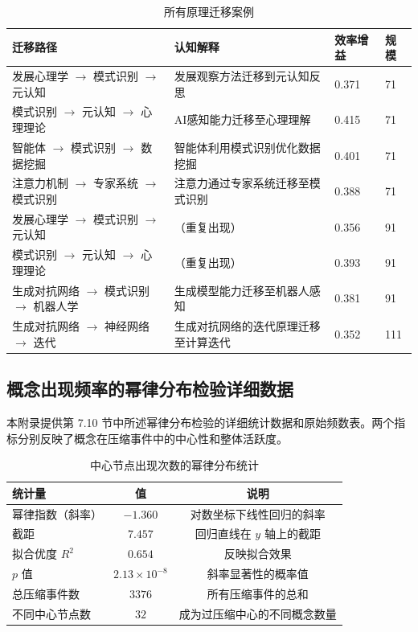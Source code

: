 \documentclass[12pt,a4paper]{article}
\begin{document}
\begin{table}[H]
\centering
\caption{所有原理迁移案例}
\label{tab:app_migration_cases}
\begin{tabular}{p{4cm}p{4.5cm}p{2cm}p{1cm}}
\toprule
\textbf{迁移路径} & \textbf{认知解释} & \textbf{效率增益} & \textbf{规模} \\
\midrule
发展心理学 $\rightarrow$ 模式识别 $\rightarrow$ 元认知 & 发展观察方法迁移到元认知反思 & 0.371 & 71 \\
模式识别 $\rightarrow$ 元认知 $\rightarrow$ 心理理论 & AI感知能力迁移至心理理解 & 0.415 & 71 \\
智能体 $\rightarrow$ 模式识别 $\rightarrow$ 数据挖掘 & 智能体利用模式识别优化数据挖掘 & 0.401 & 71 \\
注意力机制 $\rightarrow$ 专家系统 $\rightarrow$ 模式识别 & 注意力通过专家系统迁移至模式识别 & 0.388 & 71 \\
发展心理学 $\rightarrow$ 模式识别 $\rightarrow$ 元认知 & （重复出现） & 0.356 & 91 \\
模式识别 $\rightarrow$ 元认知 $\rightarrow$ 心理理论 & （重复出现） & 0.393 & 91 \\
生成对抗网络 $\rightarrow$ 模式识别 $\rightarrow$ 机器人学 & 生成模型能力迁移至机器人感知 & 0.381 & 91 \\
生成对抗网络 $\rightarrow$ 神经网络 $\rightarrow$ 迭代 & 生成对抗网络的迭代原理迁移至计算迭代 & 0.352 & 111 \\
\bottomrule
\end{tabular}
\end{table}

\subsection{概念出现频率的幂律分布检验详细数据}

本附录提供第 7.10 节中所述幂律分布检验的详细统计数据和原始频数表。两个指标分别反映了概念在压缩事件中的中心性和整体活跃度。

\begin{table}[H]
\centering
\caption{中心节点出现次数的幂律分布统计}
\label{tab:app_zipf_center}
\begin{tabular}{lcc}
\toprule
\textbf{统计量} & \textbf{值} & \textbf{说明} \\
\midrule
幂律指数（斜率） & $-1.360$ & 对数坐标下线性回归的斜率 \\
截距 & $7.457$ & 回归直线在 $y$ 轴上的截距 \\
拟合优度 $R^2$ & $0.654$ & 反映拟合效果 \\
$p$ 值 & $2.13\times10^{-8}$ & 斜率显著性的概率值 \\
总压缩事件数 & $3376$ & 所有压缩事件的总和 \\
不同中心节点数 & $32$ & 成为过压缩中心的不同概念数量 \\
\bottomrule
\end{tabular}
\end{table}
\end{document}
